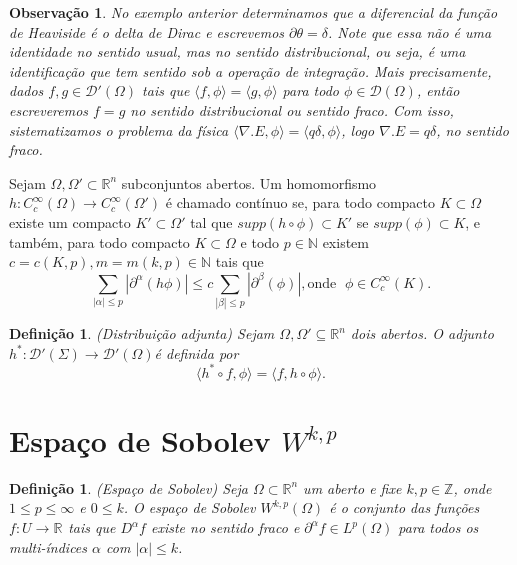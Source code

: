 \documentclass[12pt]{book}
\newtheorem{definicao}[teorema]{Definição}
\newtheorem{observacao}[teorema]{Observação}
\newcommand{\distribuicoes}{\distribuicoesgeral{\Omega}}
\newcommand{\distribuicoesgeral}[1]{\mathcal{D'}(#1)}
\newcommand{\espacoLp}[1]{L^{p}(#1)}
\newcommand{\funcoesdiferenciaveissupp}[2]{C^{#1}_{c}(#2)}
\newcommand{\funcoesteste}{\mathcal{D}(\Omega)}
\newcommand{\inteiros}{\mathbb{Z}}
\newcommand{\produtointerno}[2]{\langle #1, #2 \rangle}
\newcommand{\real}[1]{\mathbb{R}^{#1}}
\newcommand{\reta}{\real{}}
\begin{document}
	\begin{observacao}
		No exemplo anterior determinamos que a diferencial da função de Heaviside é o delta de Dirac e escrevemos $\partial \theta = \delta$. Note que essa não é uma identidade no sentido usual, mas no sentido distribucional, ou seja, é uma identificação que tem sentido sob a operação de integração. Mais precisamente, dados $f,g \in \distribuicoes$ tais que $\produtointerno{f}{\phi}=\produtointerno{g}{\phi}$ para todo $\phi \in \funcoesteste$, então escreveremos $f=g$ no sentido distribucional ou sentido fraco. Com isso, sistematizamos o problema da física $\produtointerno{\nabla.E}{\phi} = \produtointerno{q\delta}{\phi}$, logo $\nabla.E = q\delta$, no sentido fraco.
	\end{observacao}
	
	Sejam $\Omega, \Omega'\subset \real{n}$ subconjuntos abertos. Um homomorfismo $h : \funcoesdiferenciaveissupp{\infty}{\Omega} \to \funcoesdiferenciaveissupp{\infty}{\Omega'}$ é chamado contínuo se, para todo compacto $K \subset \Omega$ existe um compacto $K' \subset \Omega'$ tal que $supp(h \circ \phi ) \subset K'$ se $supp(\phi) \subset K$, e também, para todo compacto $K \subset \Omega$ e todo $p \in \mathbb{N}$ existem $c = c(K,p), m = m(k,p) \in \mathbb{N}$ tais que 
	$$
	\sum_{|\alpha|\leq p}|\partial^{\alpha}(h\phi)|\leq c			\sum_{|\beta|\leq p}|\partial^{\beta}(\phi)|, \text{onde }\; \phi \in \funcoesdiferenciaveissupp{\infty}{K}.
	$$
	
	\begin{definicao}\label{definicao_distribuicao_adjunta}
		(Distribuição adjunta) Sejam $\Omega, \Omega'\subseteq \real{n}$ dois abertos. O adjunto $h^{*}: \distribuicoesgeral{\Sigma} \to \distribuicoesgeral{\Omega}$é definida por
		$$
		\produtointerno{h^{*}\circ f}{\phi} = 		\produtointerno{f}{h\circ\phi}.
		$$
	\end{definicao}\label{definicao_espalo_sobolev}
	
	\section{Espaço de Sobolev $W^{k,p}$}\label{secao_espaco_sobolev}
	\begin{definicao}\label{definicao_espaco_sobolev}
		(Espaço de Sobolev) Seja $\Omega \subset \real{n}$ um aberto e fixe $k, p\in \inteiros$, onde $1\leq p \leq \infty$ e $0\leq k$. O espaço de Sobolev $W^{k,p} (\Omega)$ é o conjunto das funções $f:U\to \reta$ tais que $D^{\alpha}f$ existe no sentido fraco e $\partial^{\alpha}f \in \espacoLp{\Omega}$ para todos os multi-índices $\alpha$ com $|\alpha|\leq k$.
	\end{definicao}
	
\end{document}
